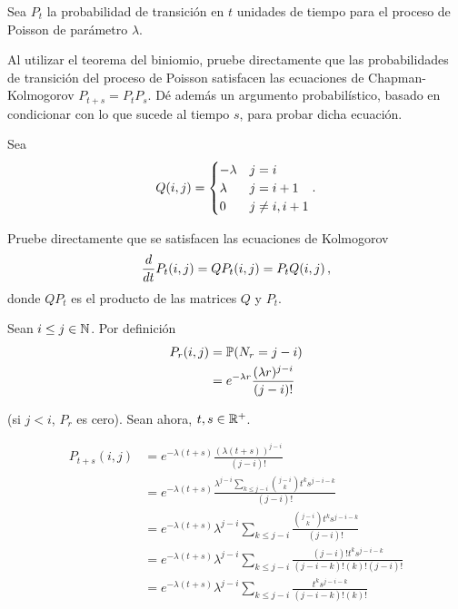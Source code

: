\begin{problema}
    Sea $P_t$ la probabilidad de transici\'on en $t$ unidades de tiempo para el proceso de Poisson de 
    par\'ametro $\lambda$. 

    Al utilizar el teorema del biniomio, pruebe directamente que las probabilidades de transici\'on del 
    proceso de Poisson satisfacen las ecuaciones de Chapman-Kolmogorov $P_{t+s}=P_tP_s$. D\'e adem\'as un 
    argumento probabil\'istico, basado en condicionar con lo que sucede al tiempo $s$, para probar dicha ecuaci\'on. 

    Sea
    \begin{align}\label{problema5_4:definicionQ}
        \imf{Q}{i,j}=
            \begin{cases}
                -\lambda    &   j   =       i     \\
                \lambda     &   j   =       i+1   \\
                0           &   j   \neq    i,i+1
            \end{cases}.
    \end{align}

    Pruebe directamente que se satisfacen las ecuaciones de Kolmogorov
    \begin{equation*} %
        \frac{d}{dt}\imf{P_t}{i,j}=\imf{QP_t}{i,j}=\imf{P_tQ}{i,j},
    \end{equation*}
    donde $QP_t$ es el producto de las matrices $Q$ y $P_t$.
\end{problema}

\afterstatement\pn

Sean $i \leq j \in \N$. Por definición
\begin{align}
    P_r(i, j)   &=  \P(N_r = j-i)   \\
                &=  e^{-\lambda r}   \frac{(\lambda r)^{j - i}}{(j - i)!}
\end{align}\pn

(si $j < i$, $P_r$ es cero). Sean ahora, $t,s \in \R^+$.

\begin{align}
    P_{t + s}(i,j)  &=  e^{-\lambda (t+s)}  \frac{(\lambda(t+s))^{j-i}}{(j-i)!}                                                 \\
                    &=  e^{-\lambda (t+s)}  \frac{\lambda^{j-i} \sum_{k \leq j-i} \binom{j-i}{k} t^k s^{j-i-k}}{(j-i)!}         \\
                    &=  e^{-\lambda (t+s)} \lambda^{j-i} \sum_{k \leq j-i} \frac{ \binom{j-i}{k} t^k s^{j-i-k}}{(j-i)!}         \\
                    &=  e^{-\lambda (t+s)} \lambda^{j-i} \sum_{k \leq j-i} \frac{ (j-i)! t^k s^{j-i-k}}{(j-i-k)!(k)!(j-i)!}     \\
                    &=  e^{-\lambda (t+s)} \lambda^{j-i} \sum_{k \leq j-i} \frac{ t^k s^{j-i-k}}{(j-i-k)!(k)!}     \\
\end{align}\pn

